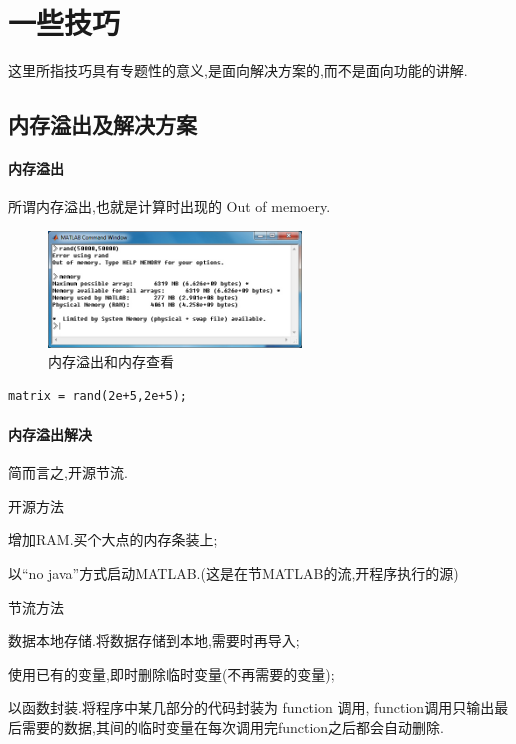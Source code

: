 \section{一些技巧}
这里所指技巧具有专题性的意义,是面向解决方案的,而不是面向功能的讲解.



\subsection{内存溢出及解决方案}

\paragraph{内存溢出}所谓内存溢出,也就是计算时出现的 Out of memoery.

\begin{figure}[htbp]
\includegraphics[width=0.6\textwidth]{diagrams/memoryout}
\caption{内存溢出和内存查看}
\end{figure}

\vspace{-0.8cm}
\begin{lstlisting}[caption = 生成随机矩阵]
  matrix = rand(2e+5,2e+5);
\end{lstlisting}



\paragraph{内存溢出解决}简而言之,开源节流.
\begindot
\item 开源方法
\begin{itemize*}
\item 增加RAM.买个大点的内存条装上;
\item 以“no java”方式启动MATLAB.(这是在节MATLAB的流,开程序执行的源)
\end{itemize*}
\item 节流方法
\begin{itemize*}
\item 数据本地存储.将数据存储到本地,需要时再导入;
\item 使用已有的变量,即时删除临时变量(不再需要的变量);
\item 以函数封装.将程序中某几部分的代码封装为 function 调用, function调用只输出最后需要的数据,其间的临时变量在每次调用完function之后都会自动删除.
\end{itemize*}
\myenddot



